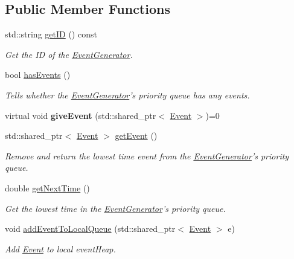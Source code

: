 \subsection*{\-Public \-Member \-Functions}
\begin{DoxyCompactItemize}
\item 
std\-::string \hyperlink{classEventGenerator_a467b319c4317b83b9c16708c9815953d}{get\-I\-D} () const 
\begin{DoxyCompactList}\small\item\em \-Get the \-I\-D of the \hyperlink{classEventGenerator}{\-Event\-Generator}. \end{DoxyCompactList}\item 
bool \hyperlink{classEventGenerator_a1fd7fdcaa263115e89a9fc69b85eca22}{has\-Events} ()
\begin{DoxyCompactList}\small\item\em \-Tells whether the \hyperlink{classEventGenerator}{\-Event\-Generator}'s priority queue has any events. \end{DoxyCompactList}\item 
\hypertarget{classEventGenerator_a5d7d4625d7dc71a887cf39a144cc2efa}{virtual void {\bfseries give\-Event} (std\-::shared\-\_\-ptr$<$ \hyperlink{classEvent}{\-Event} $>$)=0}\label{classEventGenerator_a5d7d4625d7dc71a887cf39a144cc2efa}

\item 
std\-::shared\-\_\-ptr$<$ \hyperlink{classEvent}{\-Event} $>$ \hyperlink{classEventGenerator_ab40fd3a0bf1aa974ba50feb443d81009}{get\-Event} ()
\begin{DoxyCompactList}\small\item\em \-Remove and return the lowest time event from the \hyperlink{classEventGenerator}{\-Event\-Generator}'s priority queue. \end{DoxyCompactList}\item 
double \hyperlink{classEventGenerator_ac4b5ccdeaf232fe59854535bb13747a9}{get\-Next\-Time} ()
\begin{DoxyCompactList}\small\item\em \-Get the lowest time in the \hyperlink{classEventGenerator}{\-Event\-Generator}'s priority queue. \end{DoxyCompactList}\item 
void \hyperlink{classEventGenerator_a3487849484c9b521527d6acacee79e88}{add\-Event\-To\-Local\-Queue} (std\-::shared\-\_\-ptr$<$ \hyperlink{classEvent}{\-Event} $>$ e)
\begin{DoxyCompactList}\small\item\em \-Add \hyperlink{classEvent}{\-Event} to local event\-Heap. \end{DoxyCompactList}\end{DoxyCompactItemize}
